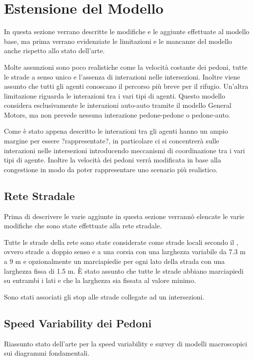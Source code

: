 \section{Estensione del Modello}
In questa sezione verrano descritte le modifiche e le aggiunte effettuate al modello base,
ma prima verrano evidenziate le limitazioni e le mancanze del modello anche rispetto allo stato dell'arte.

Molte assunzioni sono poco realistiche come la velocità costante dei pedoni, tutte le strade a senso unico e l'assenza di interazioni nelle
intersezioni.
%
Inoltre viene assunto che tutti gli agenti conoscano il percorso più breve per il rifugio.
%
Un'altra limitazione riguarda le interazioni tra i vari tipi di agenti.
Questo modello considera esclusivamente le interazioni auto-auto
tramite il modello General Motors, ma non prevede nessuna interazione pedone-pedone o pedone-auto.

Come è stato appena descritto le interazioni tra gli agenti
hanno un ampio margine per essere ?rappresentate?, in particolare ci si concentrerà sulle interazioni nelle intersezioni
introducendo meccanismi di coordinazione tra i vari tipi di agente. Inoltre la velocità dei pedoni verrà modificata in base alla congestione
in modo da poter rappresentare uno scenario più realistico.

\subsection{Rete Stradale}
Prima di descrivere le varie aggiunte in questa sezione verrannò elencate le varie modifiche che sono state effettuate alla rete stradale.

Tutte le strade della rete sono state considerate come strade locali secondo il \textcite{seaside2010tsp},
ovvero strade a doppio senso e a una corsia con una larghezza variabile da 7.3 m a 9 m e opzionalmente
un marciapiedie per ogni lato della strada con una larghezza fissa di 1.5 m.
%
È stato assunto che tutte le strade abbiano marciapiedi su entrambi i lati e che la larghezza sia fissata al valore minimo.

Sono stati associati gli stop alle strade collegate ad un intersezioni.

\subsection{Speed Variability dei Pedoni}
Riassunto stato dell'arte per la speed variability e survey di modelli macroscopici sui diagrammi fondamentali.

